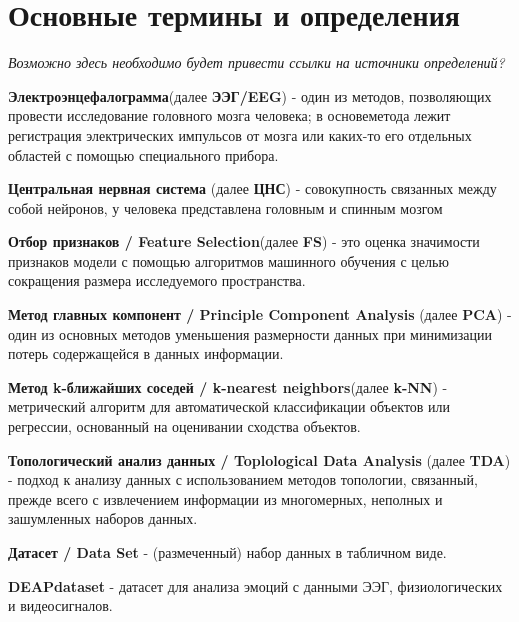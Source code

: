 \documentclass{article}
\begin{document}
\makeTitlePage
{
  \hypersetup{linkcolor=black}
  \tableofcontents
}


\section{Основные термины и определения}

\textit{Возможно здесь необходимо будет привести ссылки на источники определений?}

\textbf{Электроэнцефалограмма}(далее \textbf{ЭЭГ/EEG}) - один из методов, позволяющих провести исследование головного мозга человека; в основеметода лежит регистрация электрических импульсов от мозга или каких-то его отдельных областей с помощью специального прибора.

\textbf{Центральная нервная система} (далее \textbf{ЦНС}) - совокупность связанных между собой нейронов, у человека представлена головным и спинным мозгом

\textbf{Отбор признаков / Feature Selection}(далее \textbf{FS}) - это оценка значимости признаков модели с помощью алгоритмов машинного обучения с целью сокращения размера исследуемого пространства.

\textbf{Метод главных компонент / Principle Component Analysis} (далее \textbf{PCA}) - один из основных методов уменьшения размерности данных при минимизации потерь содержащейся в данных информации.

\textbf{Метод k-ближайших соседей / k-nearest neighbors}(далее \textbf{k-NN}) - метрический алгоритм для автоматической классификации объектов или регрессии, основанный на оценивании сходства объектов.

\textbf{Топологический анализ данных / Toplological Data Analysis} (далее \textbf{TDA}) - подход к анализу данных с использованием методов топологии, связанный, прежде всего с извлечением информации из многомерных, неполных и зашумленных наборов данных.

\textbf{Датасет / Data Set} - (размеченный) набор данных в табличном виде.

\textbf{DEAPdataset} - датасет для анализа эмоций с данными ЭЭГ, физиологических и видеосигналов.
\end{document}
